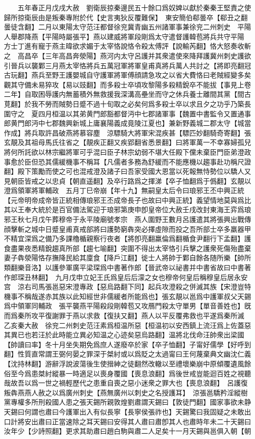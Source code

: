 　　五年春正月戊戌大赦　劉衛辰掠秦邊民五十餘口爲奴婢以獻於秦秦王堅責之使歸所掠衛辰由是叛秦專附於代【史言夷狄反覆難保】　東安簡伯郗曇卒【郗丑之翻曇徒含翻】二月以東陽太守范汪都督徐兖冀青幽五州諸軍事兼徐兖二州刺史　平陽人舉郡降燕【平陽時屬張平】燕以建威將軍段剛爲太守遣督護韓苞將兵共守平陽　方士丁進有寵于燕主暐欲求媚于太宰恪說恪令殺太傅評【說輸芮翻】恪大怒奏收斬之　高昌卒【三年高昌奔滎陽】燕河内太守呂護并其衆遣使來降拜護冀州刺史護欲引晉兵以襲鄴三月燕太宰恪將兵五萬冠軍將軍皇甫真將兵萬人共討之【將即亮翻冠古玩翻】燕兵至野王護嬰城自守護軍將軍傅顔請急攻之以省大費恪曰老賊經變多矣觀其守備未易猝攻【易以豉翻】而多殺士卒頃攻黎陽多殺精銳卒不能拔【事見上卷二年】自取困辱護内無蓄積外無救援我深溝高壘坐而守之休兵養士離間其黨【間古莧翻】於我不勞而賊勢日蹙不過十旬取之必矣何爲多殺士卒以求且夕之功乎乃築長圍守之　夏四月桓温以其弟黄門郎豁都督沔中七郡諸軍事【魏置中書監令又置通事郎黄門郎沔中七郡魏興新城上庸襄陽義成竟陵江夏也】兼新野義城二郡太守【城當作成】將兵取許昌破燕將慕容塵　涼驃騎大將軍宋混疾甚【驃匹妙翻騎奇寄翻】張玄靚及其祖母馬氏往省之【靚疾正翻又疾郢翻省悉景翻】曰將軍萬一不幸寡婦孤兒將何所託欲以林宗繼將軍可乎混曰臣子林宗幼弱不堪大任殿下儻未棄臣門臣弟澄政事愈於臣但恐其儒緩機事不稱耳【凡儒者多務為舒緩而不能應機以趨事赴功稱尺證翻】殿下策勵而使之可也混戒澄及諸子曰吾家受國大恩當以死報無恃勢位以驕人又見朝臣皆戒之以忠貞【朝直遥翻】及卒行路爲之揮涕【卒子恤翻爲于僞翻】玄靚以澄爲領軍將軍輔政　五月丁巳帝崩【年十九】無嗣皇太后令曰琅邪王丕中興正統【元帝明帝成帝皆正統相傳琅邪王丕成帝長子也故曰中興正統】義望情地莫與爲比其以王奉大統於是百官備法駕迎于琅邪第庚申卽皇帝位大赦壬戌改封東海王弈爲琅邪王秋七月戊午葬穆帝于永平陵廟號孝宗　燕人圍野王數月呂護遣其將張興出戰傳顔擊斬之城中日蹙皇甫真戒部將曰護勢窮犇突必擇虛隙而投之吾所部士卒多羸器甲不精宜深爲之備乃多課櫓楯親察行夜者【將卽亮翻羸倫爲翻楯食尹翻行下孟翻】護食盡果夜悉精銳趨真所部【趨七喻翻】突圍不得出太宰恪引兵擊之護衆死傷殆盡棄妻子犇滎陽恪存撫降民給其廩食【降戶江翻】徙士人將帥于鄴自餘各随所樂【帥所類翻樂音洛】以護參軍廣平梁琛爲中書著作郎【晉武帝以祕書并中書省故曰中書著作郎琛丑林翻】　九月戊申立妃王氏爲皇后后濛之女也穆帝何皇后稱穆皇后居永安宫　涼右司馬張邕惡宋澄專政【惡烏路翻下同】起兵攻澄殺之併滅其族【宋澄豈特機事不稱哉遂赤其族以此知經世非儒緩者所能爲也】張玄靚以邕爲中護軍叔父天錫爲中領軍同輔政　張平襲燕平陽殺段剛韓苞又攻鴈門殺太守單男【單音善姓也】旣而爲秦所攻平復謝罪于燕以求救【復扶又翻】燕人以平反覆弗救也平遂爲秦所滅　乙亥秦大赦　徐兖二州刺史范汪素爲桓温所惡【桓温初以安西鎮上流汪爲上佐蓋惡其異已也若汪於此時能立異必知温之心迹矣惡烏路翻】温將北伐命汪帥衆出梁國【帥讀曰率】冬十月坐失期免爲庶人遂廢卒於家【卒子恤翻】子甯好儒學【好呼到翻】性質直常謂王弼何晏之罪深于桀紂或以爲貶之太過甯曰王何蔑棄典文幽沈仁義【沈持林翻】游辭浮說波蕩後生使搢紳之徒翻然改轍以至禮壞樂崩中原傾覆遺風餘俗至今爲患桀紂縱暴一時適足以喪身覆國【喪息浪翻】爲後世戒豈能迴百姓之視聽哉故吾以爲一世之禍輕歷代之患重自喪之惡小迷衆之罪大也【喪息浪翻】　呂護復叛犇燕燕人赦之以爲廣州刺史【燕無廣州以刺史之名授護耳】　涼張邕驕矜淫縱樹黨專權多所刑殺國人患之張天錫所親敦煌劉肅謂天錫曰【敦徒門翻】國家事欲未静天錫曰何謂也肅曰今護軍出入有似長寧【長寧侯張祚也】天錫驚曰我固疑之未敢出口計將安出肅曰正當速除之耳天錫曰安得其人肅曰肅卽其人也肅時年未二十天錫曰汝年少【少詩照翻】更求其助肅曰趙白駒與肅二人足矣十一月天錫與邕俱入朝【朝